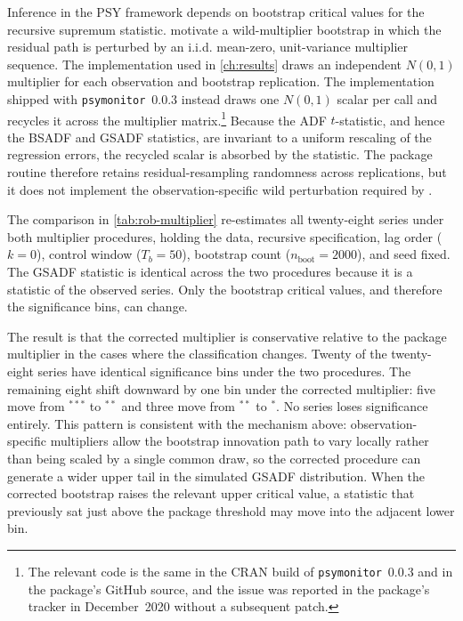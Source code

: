 Inference in the PSY framework depends on bootstrap critical values for the recursive supremum statistic. \citet{harveyEtAl2016} motivate a wild-multiplier bootstrap in which the residual path is perturbed by an i.i.d. mean-zero, unit-variance multiplier sequence. The implementation used in \cref{ch:results} draws an independent $N(0,1)$ multiplier for each observation and bootstrap replication. The implementation shipped with \texttt{psymonitor}~0.0.3 instead draws one $N(0,1)$ scalar per call and recycles it across the multiplier matrix.\footnote{The relevant code is the same in the CRAN build of \texttt{psymonitor}~0.0.3 and in the package's GitHub source, and the issue was reported in the package's tracker in December~2020 without a subsequent patch.} Because the ADF $t$-statistic, and hence the BSADF and GSADF statistics, are invariant to a uniform rescaling of the regression errors, the recycled scalar is absorbed by the statistic. The package routine therefore retains residual-resampling randomness across replications, but it does not implement the observation-specific wild perturbation required by \citet{harveyEtAl2016}.

The comparison in \cref{tab:rob-multiplier} re-estimates all twenty-eight series under both multiplier procedures, holding the data, recursive specification, lag order ($k=0$), control window ($T_b=50$), bootstrap count ($n_{\mathrm{boot}}=\num{2000}$), and seed fixed. The GSADF statistic is identical across the two procedures because it is a statistic of the observed series. Only the bootstrap critical values, and therefore the significance bins, can change.

The result is that the corrected multiplier is conservative relative to the package multiplier in the cases where the classification changes. Twenty of the twenty-eight series have identical significance bins under the two procedures. The remaining eight shift downward by one bin under the corrected multiplier: five move from $^{***}$ to $^{**}$ and three move from $^{**}$ to $^{*}$. No series loses significance entirely. This pattern is consistent with the mechanism above: observation-specific multipliers allow the bootstrap innovation path to vary locally rather than being scaled by a single common draw, so the corrected procedure can generate a wider upper tail in the simulated GSADF distribution. When the corrected bootstrap raises the relevant upper critical value, a statistic that previously sat just above the package threshold may move into the adjacent lower bin.

